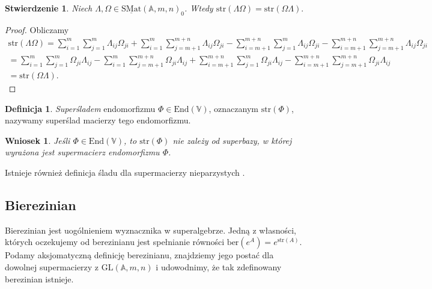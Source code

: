 \documentclass[11pt,a4paper]{report}
\newtheorem{corollary}[theorem]{Wniosek}
\newtheorem{proposition}[theorem]{Stwierdzenie}
\theoremstyle{definition}
\newtheorem{definition}[theorem]{Definicja}
\newcommand{\str}{\mathrm{str}}
\newcommand{\ber}{\mathrm{ber}}
\begin{document}
\begin{proposition}
	Niech $\Lambda, \Omega \in \underline{\mathrm{SMat}}(\mathbb{A},m,n)_0$. Wtedy $\str(\Lambda \Omega)= \str(\Omega \Lambda).$
\end{proposition}

\begin{proof}
	Obliczamy \begin{equation*}
	\begin{aligned}
		\str(\Lambda \Omega) = \sum^{m}_{i=1} \sum^{m}_{j=1} \Lambda_{ij} \Omega_{ji} + \sum^{m}_{i=1} \sum^{m+n}_{j=m+1} \Lambda_{ij} \Omega_{ji} - \sum^{m+n}_{i=m+1} \sum^{m}_{j=1} \Lambda_{ij} \Omega_{ji} - \sum^{m+n}_{i=m+1} \sum^{m+n}_{j=m+1} \Lambda_{ij} \Omega_{ji} \\
		= \sum^{m}_{i=1} \sum^{m}_{j=1} \Omega_{ji} \Lambda_{ij}  - \sum^{m}_{i=1} \sum^{m+n}_{j=m+1} \Omega_{ji} \Lambda_{ij} + \sum^{m+n}_{i=m+1} \sum^{m}_{j=1} \Omega_{ji} \Lambda_{ij} - \sum^{m+n}_{i=m+1} \sum^{m+n}_{j=m+1} \Omega_{ji} \Lambda_{ij}                     \\
		= \str(\Omega \Lambda).                                                                                                                                                                                                                                                  
	\end{aligned}
	\end{equation*}
\end{proof}

\begin{definition}
	\textit{Superśladem} endomorfizmu $\Phi \in \mathrm{End}(\mathbb{V})$, oznaczanym $\str(\Phi)$, nazywamy superślad macierzy tego endomorfizmu.
\end{definition}

\begin{corollary}
	Jeśli $\Phi \in \mathrm{End}(\mathbb{V})$, to $\str(\Phi)$ nie zależy od superbazy, w której wyrażona jest supermacierz endomorfizmu $\Phi$.
\end{corollary}

Istnieje również definicja śladu dla supermacierzy nieparzystych \cite{leites}.

\subsection{Bierezinian}

Bierezinian jest uogólnieniem wyznacznika w superalgebrze. Jedną z własności, których oczekujemy od berezinianu jest spełnianie równości $\ber (e^{A}) = e^{\str (A)}.$ Podamy aksjomatyczną definicję berezinianu, znajdziemy jego postać dla dowolnej supermacierzy z $\mathrm{GL}(\mathbb{A},m,n)$ i udowodnimy, że tak zdefinowany berezinian istnieje.
\end{document}
